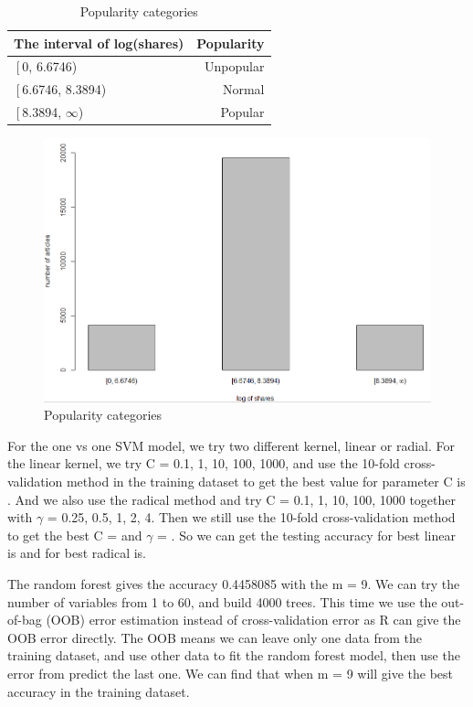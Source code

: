 \documentclass[11pt]{article}
\begin{document}
    \begin{table}[h]
        \centering
        \caption{Popularity categories}
        \begin{tabular}{ l | r }
            \hline\hline
            The interval of log(shares) & Popularity\\
            \hline
            $\left[$0, 6.6746) & Unpopular \\
            $\left[$6.6746, 8.3894) & Normal \\
            $\left[$8.3894, $\infty$) & Popular \\
            \hline\hline
        \end{tabular}
        \label{table:Popularity}
    \end{table}

    \begin{figure}[h]
        \centering
        \includegraphics[width=0.7\linewidth]{poplularity.png}
        \caption{Popularity categories}
    \end{figure}

For the one vs one SVM model, we try two different kernel, linear or radial. For the linear kernel, we try C = 0.1, 1, 10, 100, 1000, and use the 10-fold cross-validation method in the training dataset to get the best value for parameter C is . And we also use the radical method and try C = 0.1, 1, 10, 100, 1000 together with $\gamma$ = 0.25, 0.5, 1, 2, 4. Then we still use the 10-fold cross-validation method to get the best C =  and $\gamma$ = . So we can get the testing accuracy for best linear is and for best radical is.

The random forest gives the accuracy 0.4458085 with the m = 9. We can try the number of variables from 1 to 60, and build 4000 trees. This time we use the out-of-bag (OOB) error estimation instead of cross-validation error as R can give the OOB error directly. The OOB means we can leave only one data from the training dataset, and use other data to fit the random forest model, then use the error from predict the last one. We can find that when m = 9 will give the best accuracy in the training dataset. 
\end{document}
